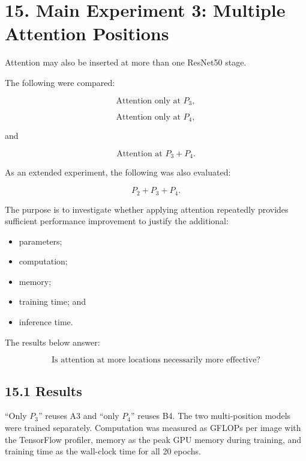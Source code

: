 \documentclass[10pt]{article}
\begin{document}
\section*{15. Main Experiment 3: Multiple Attention Positions}

Attention may also be inserted at more than one ResNet50 stage.

The following were compared:

\[
\text{Attention only at }P_3,
\]

\[
\text{Attention only at }P_4,
\]

and

\[
\text{Attention at }P_3+P_4.
\]

As an extended experiment, the following was also evaluated:

\[
P_2+P_3+P_4.
\]

The purpose is to investigate whether applying attention repeatedly provides
sufficient performance improvement to justify the additional:

\begin{itemize}

\item parameters;

\item computation;

\item memory;

\item training time; and

\item inference time.

\end{itemize}

The results below answer:

\[
\boxed{
\text{Is attention at more locations necessarily more effective?}
}
\]

\subsection*{15.1 Results}

``Only $P_3$'' reuses A3 and ``only $P_4$'' reuses B4. The two
multi-position models were trained separately. Computation was measured as
GFLOPs per image with the TensorFlow profiler, memory as the peak GPU memory
during training, and training time as the wall-clock time for all 20 epochs.
\end{document}

